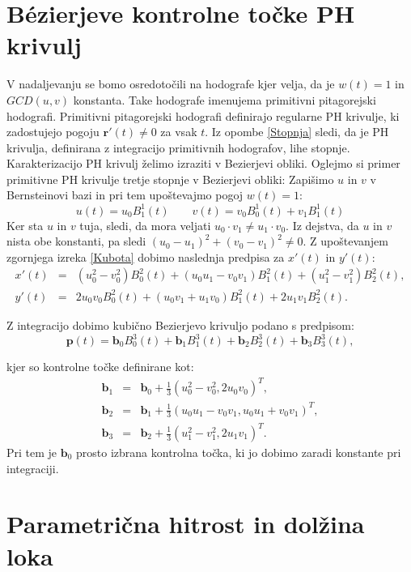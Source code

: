 \documentclass[12pt]{article}
\begin{document}
\section{B\'ezierjeve kontrolne točke PH krivulj}
V nadaljevanju se bomo osredotočili na hodografe kjer velja, da je $w(t) = 1$ in $GCD(u,v)$ konstanta.
Take hodografe imenujema primitivni pitagorejski hodografi. 
Primitivni pitagorejski hodografi definirajo regularne PH krivulje, ki zadostujejo pogoju $\textbf{r}'(t) \neq 0$ za vsak $t$. 
Iz opombe \ref{Stopnja} sledi, da je PH krivulja, definirana z integracijo
primitivnih hodografov, lihe stopnje.\newline
Karakterizacijo PH krivulj želimo izraziti v Bezierjevi obliki.
Oglejmo si primer primitivne PH krivulje tretje stopnje v Bezierjevi obliki:\newline
Zapišimo $u$ in $v$ v Bernsteinovi bazi in pri tem upoštevajmo pogoj $w(t) = 1$:
$$u(t) = u_0 B^1_1(t) \quad \quad v(t) = v_0 B^1_0(t) + v_1 B^1_1(t)$$
Ker sta $u$ in $v$ tuja, sledi, da mora veljati $u_0 \cdot v_1 \neq u_1 \cdot v_0$. Iz dejstva, da
$u$ in $v$ nista obe konstanti, pa sledi $(u_0 - u_1)^2 + (v_0 - v_1)^2 \neq 0$.
\label{primer}
\noindent Z upoštevanjem zgornjega izreka \ref{Kubota} dobimo naslednja predpisa za $x'(t)$ in $y'(t)$:
\begin{eqnarray}
	x'(t) &=& (u_0^2 - v_0^2)B_0^2(t) + (u_0 u_1 - v_0 v_1) B_1^2(t) + (u_1^2 - v_1^2) B_2^2(t),\nonumber\\
	y'(t) &=& 2 u_0 v_0 B_0^2(t) + (u_0 v_1 + u_1 v_0) B_1^2(t) + 2 u_1 v_1 B_2^2(t).\nonumber
\end{eqnarray}

Z integracijo dobimo kubično Bezierjevo krivuljo podano s predpisom:
$$\textbf{p}(t) = \textbf{b}_0 B_0^3(t) + \textbf{b}_1 B_1^3(t) + \textbf{b}_2 B_2^3(t) + \textbf{b}_3 B_3^3(t),$$

kjer so kontrolne točke definirane kot:
\begin{eqnarray}
	\textbf{b}_1 &=& \textbf{b}_0 + \frac{1}{3}(u_0^2 - v_0^2, 2 u_0 v_0)^T,\nonumber\\
	\textbf{b}_2 &=& \textbf{b}_1 + \frac{1}{3}(u_0 u_1 - v_0 v_1, u_0 u_1 + v_0 v_1)^T,\nonumber\\
	\textbf{b}_3 &=& \textbf{b}_2 + \frac{1}{3} (u_1^2 - v_1^2, 2 u_1 v_1)^T.\nonumber
\end{eqnarray}
Pri tem je $\textbf{b}_0$ prosto izbrana kontrolna točka, ki jo dobimo zaradi konstante pri integraciji.
\section{Parametrična hitrost in dolžina loka}
\end{document}
